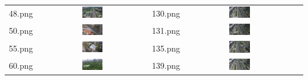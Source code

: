 \begin{table}[htbp]
\begin{tabular}{ccccc}
        48.png & \includegraphics[width=0.2\textwidth]{pic/raw/48.png} & 130.png & \includegraphics[width=0.2\textwidth]{pic/raw/130.png} \\
        50.png & \includegraphics[width=0.2\textwidth]{pic/raw/50.png} & 131.png & \includegraphics[width=0.2\textwidth]{pic/raw/131.png} \\
        55.png & \includegraphics[width=0.2\textwidth]{pic/raw/55.png} & 135.png & \includegraphics[width=0.2\textwidth]{pic/raw/135.png} \\
        60.png & \includegraphics[width=0.2\textwidth]{pic/raw/60.png} & 139.png & \includegraphics[width=0.2\textwidth]{pic/raw/139.png} \\
        \bottomrule
    \end{tabular}%
    \label{tab:uavid}%
  \end{table}%

  \newpage

